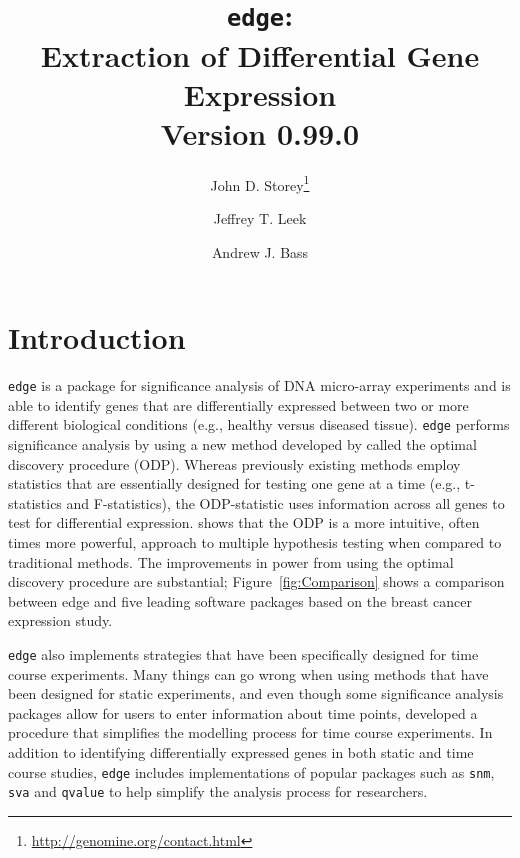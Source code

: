 \documentclass{article}\usepackage[]{graphicx}\usepackage[]{color}
\begin{document}
\title{{\tt edge}:\\ Extraction of Differential Gene Expression \\ Version 0.99.0}

\author[1]{John D. Storey\thanks{\url{http://genomine.org/contact.html}}}
\author[2]{Jeffrey T. Leek}
\author[1]{Andrew J. Bass}

\renewcommand\Authands{ and }

\maketitle
\tableofcontents
\newpage
\section{Introduction}

{\tt edge} is a package for significance analysis of DNA micro-array experiments and is able to identify genes that are differentially expressed between two or more different biological conditions (e.g., healthy versus diseased tissue). {\tt edge} performs significance analysis by using a new method developed by \cite{storey:2007} called the optimal discovery procedure (ODP). Whereas previously existing methods employ statistics that are essentially designed for testing one gene at a time (e.g., t-statistics and F-statistics), the ODP-statistic uses information across all genes to test for differential expression. \cite{storey:etal:2007} shows that the ODP is a more intuitive, often times more powerful, approach to multiple hypothesis testing when compared to traditional methods. The improvements in power from using the optimal discovery procedure are substantial; Figure~\ref{fig:Comparison} shows a comparison between edge and five leading software packages based on the \cite{hedenfalk:2001} breast cancer expression study.

\texttt{edge} also implements strategies that have been specifically designed for time course experiments. Many things can go wrong when using methods that have been designed for static experiments, and even though some significance analysis packages allow for users to enter information about time points, \cite{storey:2005} developed a procedure that simplifies the modelling process for time course experiments. In addition to identifying differentially expressed genes in both static and time course studies, {\tt edge} includes implementations of popular packages such as {\tt snm}, {\tt sva} and {\tt qvalue} to help simplify the analysis process for researchers. 
\end{document}
